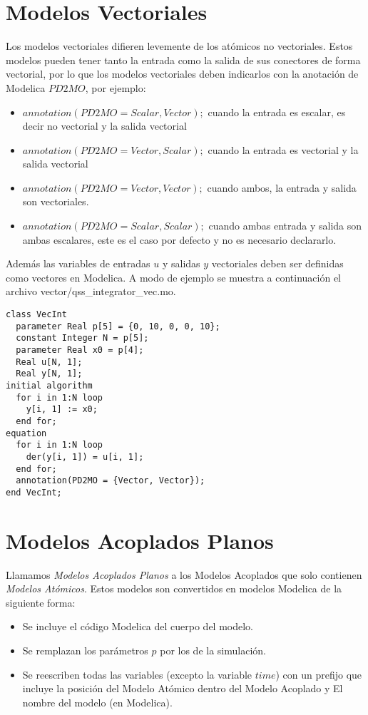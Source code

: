 \documentclass[a4paper,	11pt]{report}
\begin{document}
\section{Modelos Vectoriales}
Los modelos vectoriales difieren levemente de los atómicos no vectoriales. Estos modelos pueden tener tanto la entrada como la salida de sus conectores de forma vectorial, por lo que los modelos vectoriales deben indicarlos con la anotación de Modelica $PD2MO$, por ejemplo:
\begin{itemize}
\item $annotation(PD2MO = {Scalar, Vector});$ cuando la entrada es escalar, es decir no vectorial y la salida vectorial
\item $annotation(PD2MO = {Vector, Scalar});$ cuando la entrada es vectorial y la salida vectorial
\item $annotation(PD2MO = {Vector, Vector});$ cuando ambos, la entrada y salida son vectoriales.
\item $annotation(PD2MO = {Scalar, Scalar});$ cuando ambas entrada y salida son ambas escalares, este es el caso por defecto y no es necesario declararlo.
\end{itemize}

Además las variables de entradas $u$ y salidas $y$ vectoriales deben ser definidas como vectores en Modelica. A modo de ejemplo se muestra a continuación el archivo vector/qss\_integrator\_vec.mo.


\begin{verbatim}
class VecInt
  parameter Real p[5] = {0, 10, 0, 0, 10};
  constant Integer N = p[5];
  parameter Real x0 = p[4];
  Real u[N, 1];
  Real y[N, 1];
initial algorithm
  for i in 1:N loop
    y[i, 1] := x0;
  end for;
equation
  for i in 1:N loop
    der(y[i, 1]) = u[i, 1];
  end for;
  annotation(PD2MO = {Vector, Vector});
end VecInt;
\end{verbatim}

\section{Modelos Acoplados Planos}

Llamamos \emph{Modelos Acoplados Planos} a los Modelos Acoplados que solo contienen \emph{Modelos Atómicos}. Estos modelos son convertidos en modelos Modelica de la siguiente forma:
\begin{itemize}
	\item Se incluye el código Modelica del cuerpo del modelo.
	\item Se remplazan los parámetros $p$ por los de la simulación.
	\item Se reescriben todas las variables (excepto la variable $time$) con un prefijo que incluye la posición del Modelo Atómico dentro del Modelo Acoplado y El nombre del modelo (en Modelica).
\end{itemize}
\end{document}
